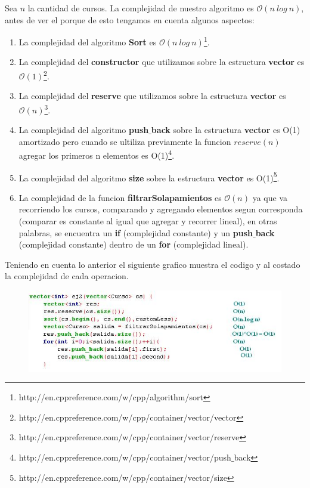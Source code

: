 Sea $n$ la cantidad de cursos. La complejidad de nuestro algoritmo es $\mathcal{O}(n\ log\ n)$, antes de ver el porque de esto tengamos en cuenta algunos aspectos:
\begin{enumerate}
\item La complejidad del algoritmo \textbf{Sort} es $\mathcal{O}(n\ log\ n)$\footnote{http://en.cppreference.com/w/cpp/algorithm/sort}.
\item La complejidad del \textbf{constructor} que utilizamos sobre la estructura \textbf{vector} es $\mathcal{O}(1)$\footnote{http://en.cppreference.com/w/cpp/container/vector/vector}.
\item La complejidad del \textbf{reserve} que utilizamos sobre la estructura \textbf{vector} es $\mathcal{O}(n)$\footnote{http://en.cppreference.com/w/cpp/container/vector/reserve}.
\item La complejidad del algoritmo \textbf{push$\_$back} sobre la estructura \textbf{vector} es O(1) amortizado pero cuando se ultiliza previamente la funcion $reserve(n)$ agregar los primeros n elementos es O(1)\footnote{http://en.cppreference.com/w/cpp/container/vector/push$\_$back}. 
\item La complejidad del algoritmo \textbf{size} sobre la estructura \textbf{vector} es O(1)\footnote{http://en.cppreference.com/w/cpp/container/vector/size}.
\item La complejidad de la funcion \textbf{filtrarSolapamientos} es $\mathcal{O}(n)$ ya que va recorriendo los cursos, comparando y agregando elementos segun corresponda (comparar es constante al igual que agregar y recorrer lineal), en otras palabras, se encuentra un \textbf{if} (complejidad constante) y un \textbf{push$\_$back} (complejidad constante) dentro de un \textbf{for} (complejidad lineal). 
\end{enumerate}
Teniendo en cuenta lo anterior el siguiente grafico muestra el codigo y al costado la complejidad de cada operacion.

\begin{figure}[H] %
\begin{center}
\includegraphics[]{../imgs/comple2.jpg}
\end{center}
\end{figure}

